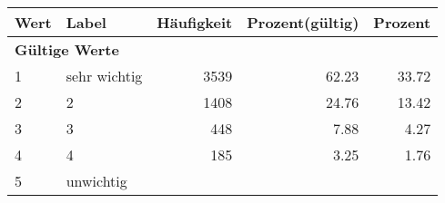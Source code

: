      \begin{longtable}{lXrrr}
     \toprule
     \textbf{Wert} & \textbf{Label} & \textbf{Häufigkeit} & \textbf{Prozent(gültig)} & \textbf{Prozent} \\
     \endhead
     \midrule
     \multicolumn{5}{l}{\textbf{Gültige Werte}}\\

     1 &
     \multicolumn{1}{X}{ sehr wichtig   } &


       \num{3539} &
       \num[round-mode=places,round-precision=2]{62,23} &
         \num[round-mode=places,round-precision=2]{33,72} \\

     2 &
     \multicolumn{1}{X}{ 2   } &


       \num{1408} &
       \num[round-mode=places,round-precision=2]{24,76} &
         \num[round-mode=places,round-precision=2]{13,42} \\

     3 &
     \multicolumn{1}{X}{ 3   } &


       \num{448} &
       \num[round-mode=places,round-precision=2]{7,88} &
         \num[round-mode=places,round-precision=2]{4,27} \\

     4 &
     \multicolumn{1}{X}{ 4   } &


       \num{185} &
       \num[round-mode=places,round-precision=2]{3,25} &
         \num[round-mode=places,round-precision=2]{1,76} \\

     5 &
     \multicolumn{1}{X}{ unwichtig   } &



\end{longtable}

